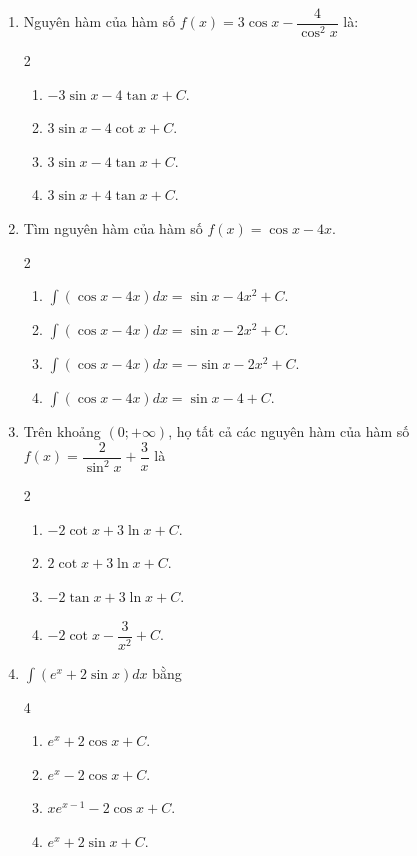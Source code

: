 \documentclass[12pt]{article}
\begin{document}
\begin{enumerate}[label=\textbf{Câu \arabic*.}]
		\item Nguyên hàm của hàm số $f(x) = 3\cos x - \dfrac{4}{\cos^2 x}$ là:
		\begin{multicols}{2}
			\begin{enumerate}[label=\textbf{\Alph*.}]
				\item $-3\sin x - 4\tan x + C$.
				\item $3\sin x - 4\cot x + C$.
				\item $3\sin x - 4\tan x + C$.
				\item $3\sin x + 4\tan x + C$.
			\end{enumerate}
		\end{multicols}
		
		\item Tìm nguyên hàm của hàm số $f(x) = \cos x - 4x$.
		\begin{multicols}{2}
			\begin{enumerate}[label=\textbf{\Alph*.}]
				\item $\displaystyle \int (\cos x - 4x)dx = \sin x - 4x^2 + C$.
				\item $\displaystyle \int (\cos x - 4x)dx = \sin x - 2x^2 + C$.
				\item $\displaystyle \int (\cos x - 4x)dx = -\sin x - 2x^2 + C$.
				\item $\displaystyle \int (\cos x - 4x)dx = \sin x - 4 + C$.
			\end{enumerate}
		\end{multicols}
		
		\item Trên khoảng $(0; +\infty)$, họ tất cả các nguyên hàm của hàm số $f(x) = \dfrac{2}{\sin^2 x} + \dfrac{3}{x}$ là
		\begin{multicols}{2}
			\begin{enumerate}[label=\textbf{\Alph*.}]
				\item $-2\cot x + 3\ln x + C$.
				\item $2\cot x + 3\ln x + C$.
				\item $-2\tan x + 3\ln x + C$.
				\item $-2\cot x - \dfrac{3}{x^2} + C$.
			\end{enumerate}
		\end{multicols}
		
		\item $\displaystyle \int (e^x + 2\sin x)dx$ bằng
		\begin{multicols}{4}
			\begin{enumerate}[label=\textbf{\Alph*.}]
				\item $e^x + 2\cos x + C$.
				\item $e^x - 2\cos x + C$.
				\item $x e^{x-1} - 2\cos x + C$.
				\item $e^x + 2\sin x + C$.
			\end{enumerate}
		\end{multicols}
		

\end{enumerate}
\end{document}
